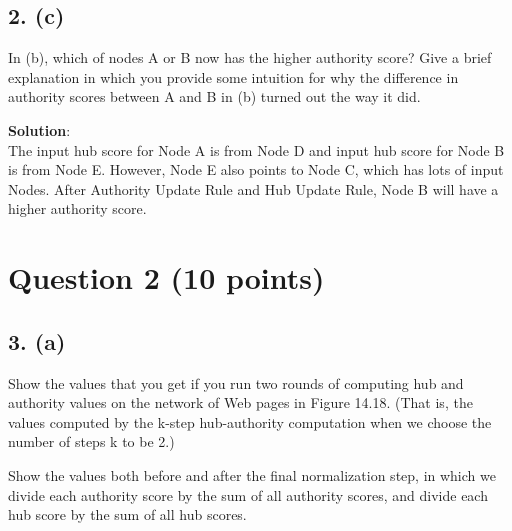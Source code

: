 \documentclass[a4paper]{article}
\begin{document}
\subsection{2. (c)}

In (b), which of nodes A or B now has the higher authority score? Give a brief explanation in which you provide some intuition for why the difference in authority scores between A and B in (b) turned out the way it did.

\textbf{Solution}:\\

The input hub score for Node A is from Node D and input hub score for Node B is from Node E. However, Node E also points to Node C, which has lots of input Nodes. After Authority Update Rule and Hub Update Rule, Node B will have a higher authority score.

\newpage

\section{Question 2 (10 points)}

\subsection{3. (a)}

Show the values that you get if you run two rounds of computing hub and authority values on the network of Web pages in Figure 14.18. (That is, the values computed by the k-step hub-authority computation when we choose the number of steps k to be 2.)

Show the values both before and after the final normalization step, in which we divide each authority score by the sum of all authority scores, and divide each hub score by the sum of all hub scores.
\end{document}
